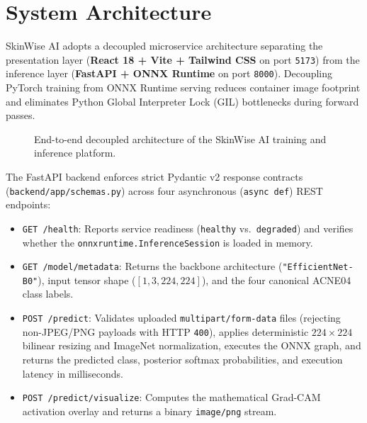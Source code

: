 \documentclass[11pt,a4paper]{article}
\begin{document}
\section{System Architecture}
\label{sec:architecture}
SkinWise AI adopts a decoupled microservice architecture separating the presentation layer (\textbf{React 18 + Vite + Tailwind CSS} on port \texttt{5173}) from the inference layer (\textbf{FastAPI + ONNX Runtime} on port \texttt{8000}). Decoupling PyTorch training from ONNX Runtime serving reduces container image footprint and eliminates Python Global Interpreter Lock (GIL) bottlenecks during forward passes.

\begin{figure}[H]
    \centering
    \caption{End-to-end decoupled architecture of the SkinWise AI training and inference platform.}
    \label{fig:architecture}
\end{figure}

The FastAPI backend enforces strict Pydantic v2 response contracts (\texttt{backend/app/schemas.py}) across four asynchronous (\texttt{async def}) REST endpoints:
\begin{itemize}[noitemsep,topsep=2pt]
    \item \texttt{GET /health}: Reports service readiness (\texttt{healthy} vs.\ \texttt{degraded}) and verifies whether the \texttt{onnxruntime.InferenceSession} is loaded in memory.
    \item \texttt{GET /model/metadata}: Returns the backbone architecture (\texttt{"EfficientNet-B0"}), input tensor shape ($[1, 3, 224, 224]$), and the four canonical ACNE04 class labels.
    \item \texttt{POST /predict}: Validates uploaded \texttt{multipart/form-data} files (rejecting non-JPEG/PNG payloads with HTTP \texttt{400}), applies deterministic $224 \times 224$ bilinear resizing and ImageNet normalization, executes the ONNX graph, and returns the predicted class, posterior softmax probabilities, and execution latency in milliseconds.
    \item \texttt{POST /predict/visualize}: Computes the mathematical Grad-CAM activation overlay and returns a binary \texttt{image/png} stream.
\end{itemize}
\end{document}
